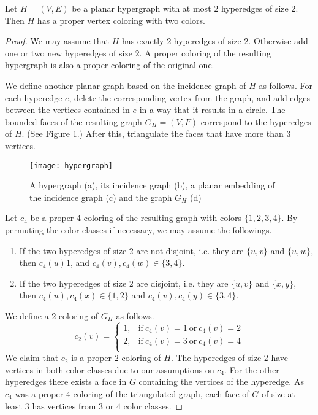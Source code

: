 \begin{thm} \label{thm:hyper}
  Let $H = (V, E)$ be a planar hypergraph with at most $2$ hyperedges of size $2$. Then $H$ has
  a proper vertex coloring with two colors.
\end{thm}
\begin{proof}
  We may assume that $H$ has exactly $2$ hyperedges of size $2$. Otherwise add
  one or two new hyperedges of size $2$. A proper coloring of the resulting hypergraph
  is also a proper coloring of the original one.

  We define another planar graph based on the incidence graph of $H$ as follows.
  For each hyperedge $e$, delete the corresponding vertex from the graph, and
  add edges between the vertices contained in $e$ in a way that it results in a circle.
  The bounded faces of the resulting graph $G_H=(V, F)$ correspond to the hyperedges of $H$.
  (See Figure \ref{fig:hyper}.) After this, triangulate the faces that have more than
  $3$ vertices.

  \begin{figure}[h]
    \centering
    \texttt{[image: hypergraph]}
    \caption{A hypergraph (a), its incidence graph (b), a planar embedding of the
      incidence graph (c) and the graph $G_H$ (d)}
    \label{fig:hyper}
  \end{figure}

  Let $c_4$ be a proper $4$-coloring of the resulting graph with colors $\{1, 2, 3, 4\}$.
  By permuting the color classes if necessary, we may assume the followings.
  \begin{enumerate}
    \item If the two hyperedges of size $2$ are not disjoint, i.e. they are $\{u, v\}$ and
      $\{u, w\}$, then $c_4(u) 1$, and $c_4(v), c_4(w) \in \{3, 4\}$.
    \item If the two hyperedges of size $2$ are disjoint, i.e. they are $\{u, v\}$ and
      $\{x, y\}$, then $c_4(u), c_4(x) \in \{1, 2\}$ and $c_4(v), c_4(y) \in \{3, 4\}$.
  \end{enumerate}
  We define a $2$-coloring of $G_H$ as follows.
  \[
    c_2(v) = \begin{cases}
      1, & \text{if}\ c_4(v) = 1 \ \text{or}\ c_4(v) = 2\\
      2, & \text{if}\ c_4(v) = 3 \ \text{or}\ c_4(v) = 4\\
    \end{cases}
  \]
  We claim that $c_2$ is a proper $2$-coloring of $H$. The hyperedges of size $2$
  have vertices in both color classes due to our assumptions on $c_4$. For the other
  hyperedges there exists a face in $G$ containing the vertices of the hyperedge.
  As $c_4$ was a proper $4$-coloring of the triangulated graph, each face of $G$
  of size at least $3$ has vertices from $3$ or $4$ color classes.
\end{proof}

